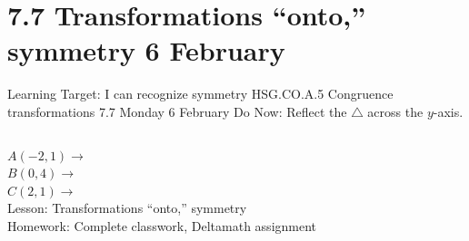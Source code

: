 \section{7.7 Transformations ``onto,'' symmetry \hfill 6 February \,}
\begin{frame}{Learning Target: I can recognize symmetry}
  {HSG.CO.A.5 Congruence transformations \hfill \alert{7.7 Monday 6 February}}
  Do Now: Reflect the $\triangle$ across the $y$-axis.  \vspace{0.5cm}
  \begin{columns}
    $A(-2,1) \rightarrow$ \\[0.3cm]
    $B(0,4) \rightarrow$ \\[0.3cm]
    $C(2,1) \rightarrow$ \\[0.3cm]
    Lesson: Transformations ``onto,'' symmetry \\[0.5cm]
    Homework: Complete classwork, Deltamath assignment
    \begin{flushright}
    \end{flushright}
  \end{columns}
\end{frame}

